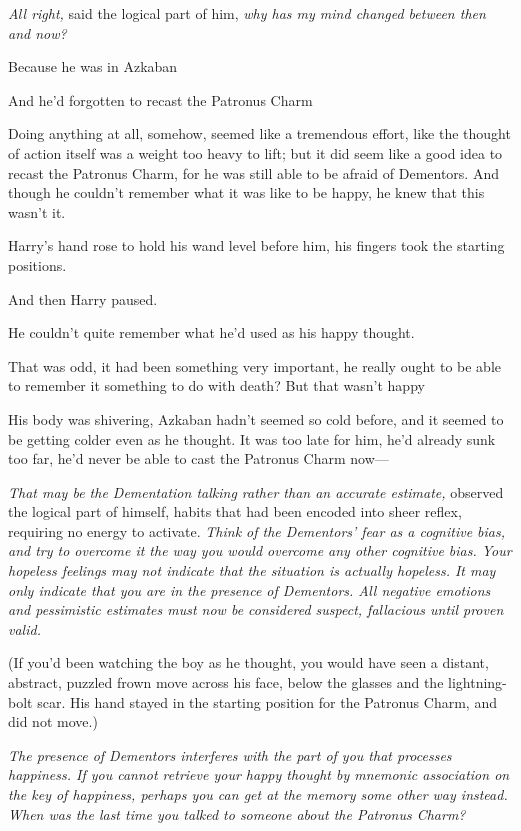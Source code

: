 \emph{All right,} said the logical part of him, \emph{why has my mind changed
between then and now?}

Because he was in Azkaban{\el}

And he'd forgotten to recast the Patronus Charm{\el}

Doing anything at all, somehow, seemed like a tremendous effort, like the
thought of action itself was a weight too heavy to lift; but it did seem like a
good idea to recast the Patronus Charm, for he was still able to be afraid of
Dementors. And though he couldn't remember what it was like to be happy, he
knew that this wasn't it.

Harry's hand rose to hold his wand level before him, his fingers took the
starting positions.

And then Harry paused.

He couldn't{\el} quite remember{\el} what he'd used as his happy thought.

That was odd, it had been something very important, he really ought to be able
to remember it{\el} something to do with death? But that wasn't happy{\el}

His body was shivering, Azkaban hadn't seemed so cold before, and it seemed to
be getting colder even as he thought. It was too late for him, he'd already
sunk too far, he'd never be able to cast the Patronus Charm now---

\emph{That may be the Dementation talking rather than an accurate estimate,}
observed the logical part of himself, habits that had been encoded into sheer
reflex, requiring no energy to activate. \emph{Think of the Dementors' fear as
a cognitive bias, and try to overcome it the way you would overcome any other
cognitive bias. Your hopeless feelings may not indicate that the situation is
actually hopeless. It may only indicate that you are in the presence of
Dementors. All negative emotions and pessimistic estimates must now be
considered suspect, fallacious until proven valid.}

(If you'd been watching the boy as he thought, you would have seen a distant,
abstract, puzzled frown move across his face, below the glasses and the
lightning-bolt scar. His hand stayed in the starting position for the Patronus
Charm, and did not move.)

\emph{The presence of Dementors interferes with the part of you that processes
happiness. If you cannot retrieve your happy thought by mnemonic association on
the key of happiness, perhaps you can get at the memory some other way instead.
When was the last time you talked to someone about the Patronus Charm?}

